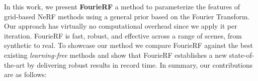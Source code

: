 
In this work, we present \textbf{FourieRF} a method to parameterize the features of grid-based NeRF methods using a general prior based on the Fourier Transform. Our approach has virtually no computational overhead since we apply it per iteration. FourieRF is fast, robust, and effective across a range of scenes, from synthetic to real. To showcase our method we compare FourieRF against the best existing \textit{learning-free} methods
and show that FourieRF establishes a new state-of-the-art by delivering robust results in record time. In summary, our contributions are as follows:



